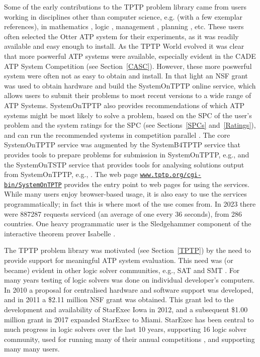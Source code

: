\documentclass{easychair}
\begin{document}
Some of the early contributions to the TPTP problem library came from users working in
disciplines other than computer science, e.g. (with a few exemplar references), in mathematics 
\cite{Qua92-Book,MP96}, logic \cite{GO86,Jec95}, management \cite{PB+92-TR,PM94}, planning 
\cite{SE94}, etc. 
These users often selected the Otter ATP system \cite{McC03-Otter} for their experiments, as
it was readily available and easy enough to install. 
As the TPTP World evolved it was clear that more poswerful ATP systems were available, especially 
evident in the CADE ATP System Competition (see Section~\ref{CASC}).
However, these more poswerful system were often not as easy to obtain and install.
In that light an NSF grant was used to obtain hardware and build the SystemOnTPTP online service,
which allows users to submit their problems to most recent versions to a wide range of ATP
Systems.
SystemOnTPTP also provides recommendations of which ATP systems might be most likely to solve
a problem, based on the SPC of the user's problem and the system ratings for the SPC
(see Sections~\ref{SPCs} and~\ref{Ratings}), and can run the recommended systems in competition
parallel \cite{SS99-FLAIRS}.
The core SystemOnTPTP service was augmented by the SystemB4TPTP service that provides tools to
prepare problems for submission in SystemOnTPTP, e.g., \cite{HV11,Sut14,KSR16} and the 
SystemOnTSTP service that provides tools for analysing solutions output from SystemOnTPTP, 
e.g., \cite{PGS06,Sut06,TPS07}.
The web page 
\href{https://www.tptp.org/cgi-bin/SystemOnTPTP}{{\tt www.tptp.org/cgi-bin/SystemOnTPTP}} 
provides the entry point to web pages for using the services.
While many users enjoy browser-based usage, it is also easy to use the services programmatically;
in fact this is where most of the use comes from.
In 2023 there were 887287 requests serviced (an average of one every 36 seconds), from 286 
countries.
One heavy programmatic user is the Sledgehammer component of the interactive theorem prover
Isabelle \cite{PB10}.

The TPTP problem library was motivated (see Section~\ref{TPTP}) by the need to provide support
for meaningful ATP system evaluation.
This need was (or became) evident in other logic solver communities, e.g., SAT \cite{HS00-SATLIB} 
and SMT \cite{BST10}.
For many years testing of logic solvers was done on individual developer's computers. 
In 2010 a proposal for centralised hardware and software support was developed, and in 2011 a 
\$2.11 million NSF grant was obtained.
This grant led to the development and availability of StarExec Iowa \cite{SST14} in 2012,
and a subsequent \$1.00 million grant in 2017 expanded StarExec to Miami.
StarExec has been central to much progress in logic solvers over the last 10 years, supporting
16 logic solver community, used for running many of their annual competitions \cite{BB+19},
and supporting many many users.
\end{document}
